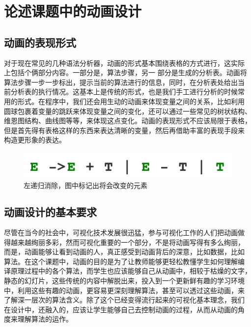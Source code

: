 \section{论述课题中的动画设计}
\subsection{动画的表现形式}
对于现在常见的几种语法分析器，动画的形式基本围绕表格的方式进行，这实际
上包括个俩部分内容。一部分是，算法步骤，另一 部分是生成的分析表。动画将
算法步骤一步一步标出，提示当前的算法进行的信息，同时，在分析表处给出当
前分析表的执行情况。这基本上是传统的形式，也是我们手工进行分析的时候常
用的形式。在程序中，我们还会用生动的动画来体现变量之间的关系，比如利用
圆球包裹着变量的跳跃来体现变量之间的变化，还可以通过一些常见的树状结构、
维恩图结构、曲线图等等，来体现这点变化。动画的表现形式不应该局限于表格，
但是首先得有表格这样的东西来表达清晰的变量，然后再借助丰富的表现手段来
构造更形象的表达。
\begin{figure}
\centering
\includegraphics[width=0.7\linewidth]{img/recursive.jpg}
\caption{左递归消除，图中标记出将会改变的元素}
\label{fig:recursive.jpg}
\end{figure}
\subsection{动画设计的基本要求}
尽管在当今的社会中，可视化技术发展很迅猛，参与可视化工作的人们把动画做
得越来越绚丽多彩，然而可视化重要的一个部分，不是将动画写得有多么绚丽，
而是，动画能够让看到动画的人，真正感受到动画背后的深意，比如数据，比如
算法。在这个课题中，动画的目的是为了让教师能够更轻松教懂学生如何理解编
译原理过程中的各个算法，而学生也应该能够自己从动画中，相较于枯燥的文字，
静态的幻灯片，这些传统的内容中解脱出来，投入到一个更新鲜有趣的学习环境
中，利用这些有趣的动画，更容易更深刻理解算法，甚至可以透过这些动画，来
了解深一层次的算法含义。除了这个已经变得流行起来的可视化基本理念，我们
在设计中，还融入的，应该让学生能够自己去控制动画的过程，从而从动画的角
度来理解算法的运作。
